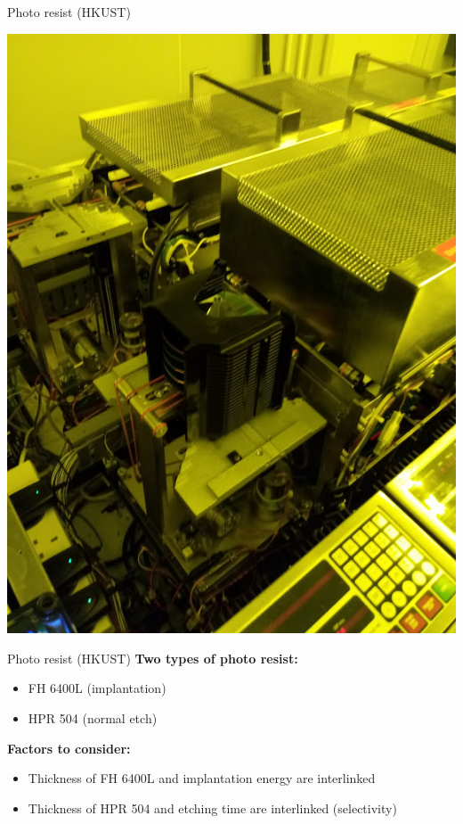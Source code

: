 \documentclass[aspectratio=169]{beamer}
\begin{document}
\begin{frame}{Photo resist (HKUST)}
\begin{center}
		\includegraphics[height=0.8\textheight]{images/20181128_154911.jpg}
	\end{center}
\end{frame}

\begin{frame}{Photo resist (HKUST)}
	\textbf{Two types of photo resist:}
	\begin{itemize}
		\item FH 6400L (implantation)
		\item HPR 504 (normal etch)
	\end{itemize}

	\textbf{Factors to consider:}
	\begin{itemize}
		\item Thickness of FH 6400L and implantation energy are interlinked
		\item Thickness of HPR 504 and etching time are interlinked (selectivity)
	\end{itemize}
\end{frame}
\end{document}
